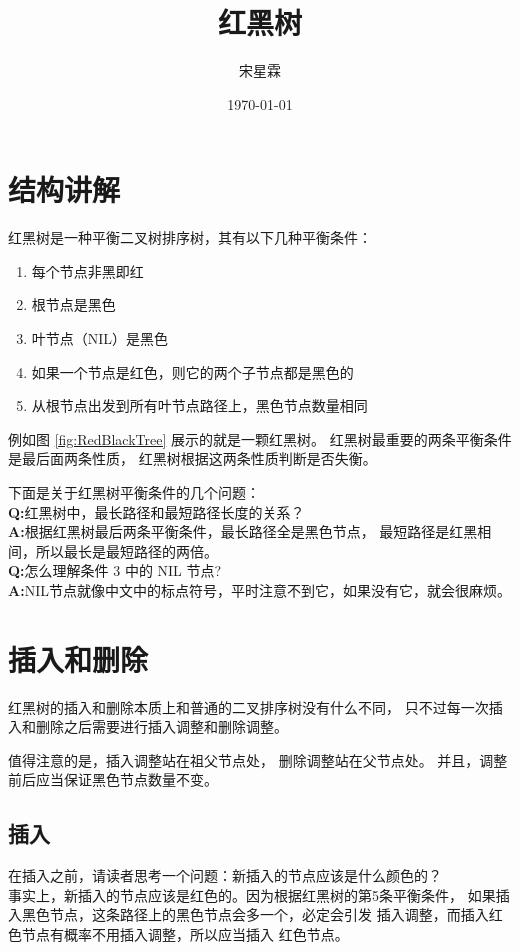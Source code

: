 \documentclass{note}
\title{红黑树}
\author{宋星霖}
\date{\today}
\begin{document}
\maketitle
\section{结构讲解}
红黑树是一种平衡二叉树排序树，其有以下几种平衡条件：
\begin{enumerate}
    \item 每个节点非黑即红
    \item 根节点是黑色
    \item 叶节点（NIL）是黑色
    \item 如果一个节点是红色，则它的两个子节点都是黑色的
    \item 从根节点出发到所有叶节点路径上，黑色节点数量相同
\end{enumerate}
例如图 \ref{fig:RedBlackTree} 展示的就是一颗红黑树。
红黑树最重要的两条平衡条件是最后面两条性质，
红黑树根据这两条性质判断是否失衡。

下面是关于红黑树平衡条件的几个问题：\\
\textbf{Q:}红⿊树中，最长路径和最短路径长度的关系？\\
\textbf{A:}根据红黑树最后两条平衡条件，最长路径全是黑色节点，
最短路径是红黑相间，所以最长是最短路径的两倍。\\
\textbf{Q:}怎么理解条件 3 中的 NIL 节点?\\
\textbf{A:}NIL节点就像中文中的标点符号，平时注意不到它，如果没有它，就会很麻烦。

\section{插入和删除}
红黑树的插入和删除本质上和普通的二叉排序树没有什么不同，
只不过每一次插入和删除之后需要进行插入调整和删除调整。

值得注意的是，插入调整站在祖父节点处，
删除调整站在父节点处。
并且，调整前后应当保证黑色节点数量不变。

\subsection{插入\texorpdfstring{\cite{insert}}{}}
在插入之前，请读者思考一个问题：新插入的节点应该是什么颜色的？\\
事实上，新插入的节点应该是红色的。因为根据红黑树的第5条平衡条件，
如果插入黑色节点，这条路径上的黑色节点会多一个，必定会引发
插入调整，而插入红色节点有概率不用插入调整，所以应当插入
红色节点。
\end{document}
